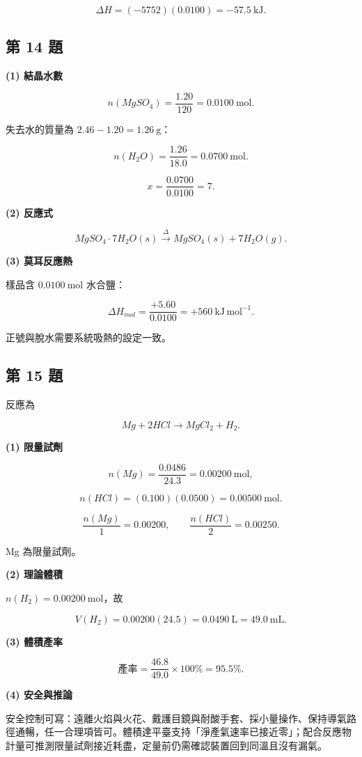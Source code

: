 \documentclass[11pt,a4paper]{article}
\begin{document}
\[
\Delta H=(-5752)(0.0100)=-57.5\ \mathrm{kJ}.
\]

\subsection{第 14 題}\label{ux7b2c-14-ux984c}

\textbf{(1) 結晶水數}

\[
n(MgSO_4)=\frac{1.20}{120}=0.0100\ \mathrm{mol}.
\]

失去水的質量為 \(2.46-1.20=1.26\ \mathrm g\)：

\[
n(H_2O)=\frac{1.26}{18.0}=0.0700\ \mathrm{mol}.
\]

\[
x=\frac{0.0700}{0.0100}=7.
\]

\textbf{(2) 反應式}

\[
\boxed{MgSO_4\cdot7H_2O(s)\xrightarrow{\Delta}MgSO_4(s)+7H_2O(g)}.
\]

\textbf{(3) 莫耳反應熱}

樣品含 \(0.0100\ \mathrm{mol}\) 水合鹽：

\[
\Delta H_{mol}=\frac{+5.60}{0.0100}=+560\ \mathrm{kJ\,mol^{-1}}.
\]

正號與脫水需要系統吸熱的設定一致。

\subsection{第 15 題}\label{ux7b2c-15-ux984c}

反應為

\[
Mg+2HCl\rightarrow MgCl_2+H_2.
\]

\textbf{(1) 限量試劑}

\[
n(Mg)=\frac{0.0486}{24.3}=0.00200\ \mathrm{mol},
\]

\[
n(HCl)=(0.100)(0.0500)=0.00500\ \mathrm{mol}.
\]

\[
\frac{n(Mg)}1=0.00200,
\qquad
\frac{n(HCl)}2=0.00250.
\]

Mg 為限量試劑。

\textbf{(2) 理論體積}

\(n(H_2)=0.00200\ \mathrm{mol}\)，故

\[
V(H_2)=0.00200(24.5)=0.0490\ \mathrm L=49.0\ \mathrm{mL}.
\]

\textbf{(3) 體積產率}

\[
\text{產率}=\frac{46.8}{49.0}\times100\%=95.5\%.
\]

\textbf{(4) 安全與推論}

安全控制可寫：遠離火焰與火花、戴護目鏡與耐酸手套、採小量操作、保持導氣路徑通暢，任一合理項皆可。體積達平臺支持「淨產氣速率已接近零」；配合反應物計量可推測限量試劑接近耗盡，定量前仍需確認裝置回到同溫且沒有漏氣。
\end{document}

